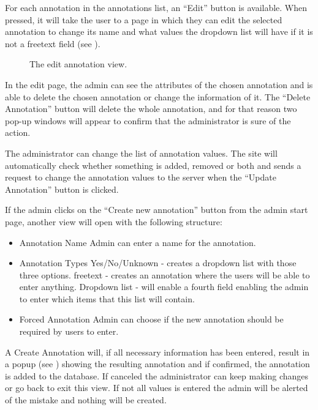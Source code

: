 For each annotation in the annotations list, an “Edit” button is available. When pressed, it will take the user to a page in which they can edit the selected annotation to change its name and what values the dropdown list will have if it is not a freetext field (see ). 

\begin{figure}[h]
 \caption{The edit annotation view.}
 \label{adm_web_editView}
\end{figure}
In the edit page, the admin can see the attributes of the chosen annotation and is able to delete the chosen annotation or change the information of it. The “Delete Annotation” button will delete the whole annotation, and for that reason two pop-up windows will appear to confirm that the administrator is sure of the action.

The administrator can change the list of annotation values. The site will automatically check whether something is added, removed or both and sends a request to change the annotation values to the server when the “Update Annotation” button is clicked.

If the admin clicks on the “Create new annotation” button from the admin start page, another view will open with the following structure:
\begin{itemize}
 \item Annotation Name
 \subitem Admin can enter a name for the annotation.
 
 \item Annotation Types
 \subitem Yes/No/Unknown - creates a dropdown list with those three options.
 \subitem freetext - creates an annotation where the users will be able to enter anything.
 \subitem Dropdown list - will enable a fourth field enabling the admin to enter which items that this list will contain.
 
 \item Forced Annotation
 \subitem Admin can choose if the new annotation should be required by users to enter. 
\end{itemize}

A Create Annotation will, if all necessary information has been entered, result in a popup (see ) showing the resulting annotation and if confirmed, the annotation is added to the database. 
If canceled the administrator can keep making changes or go back to exit this view. If not all values is entered the admin will be alerted of the mistake and nothing will be created.

